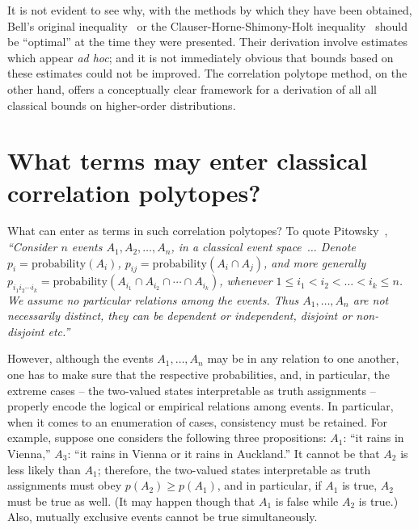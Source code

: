 \documentclass[%
  twocolumn,
 showpacs,
 showkeys,
 preprintnumbers,
 amsmath,amssymb,
 aps,
  pra,
  longbibliography,
 floatfix,
 ]{revtex4-1}
\begin{document}
It is not evident to see why, with the methods by which they have been obtained, Bell's original inequality~\cite{bell-66,Bell-71}
or the Clauser-Horne-Shimony-Holt inequality~\cite{chsh} should be ``optimal'' at the time they were presented.
Their derivation involve estimates which appear {\em ad hoc}; and it is not immediately obvious that bounds based on these estimates
could not be improved.
The correlation polytope method, on the other hand, offers a conceptually clear framework for a derivation of all all classical bounds on
higher-order distributions.

\section{What terms may enter classical correlation polytopes?}
\label{2017-b-wtmeccp}


What can enter as terms in such correlation polytopes?
To quote Pitowsky~\cite[p.~38]{pitowsky-89a},
{\em ``Consider $n$ events $A_1 , A_2, \ldots ,A_n$, in a classical event
space~$\ldots$
Denote
$p_i = \text{probability} (A_i)$,
$p_{ij} = \text{probability} (A_i \cap A_j)$,
and more generally
$p_{{i_1}{i_2}\cdots {i_k}} = \text{probability} \left (   A_{i_1} \cap A_{i_2} \cap \cdots  \cap  A_{i_k} \right)$,
whenever $1 \le i_1 < i_2 < \ldots < i_k \le n$.
We assume no particular relations among the events. Thus $A_1 ,  \ldots ,A_n$ are not
necessarily distinct, they can be dependent or independent, disjoint or non-disjoint
etc.''}

However, although the events $A_1 , \ldots ,A_n$ may be in any  relation to one another, one has to make sure that
the respective probabilities, and, in particular, the extreme cases -- the two-valued states interpretable as truth assignments
 --
properly encode the logical or empirical relations among events. In particular, when it comes to an enumeration of cases, consistency must be retained.
For example, suppose one considers the following three
propositions:
$A_1$: ``it rains in Vienna,''
$A_3$: ``it rains in Vienna or it rains in Auckland.''
It cannot be that $A_2$ is less likely than $A_1$;
therefore, the two-valued states interpretable as truth assignments must obey
$p(A_2) \ge p(A_1)$, and in particular, if $A_1$ is true, $A_2$ must be true as well.
(It may happen though that $A_1$ is false while $A_2$ is true.)
Also, mutually exclusive events cannot be true simultaneously.
\end{document}
